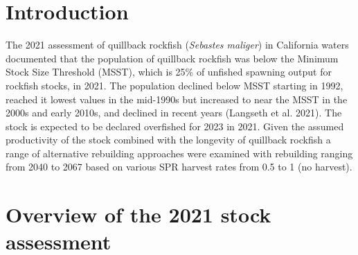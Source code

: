\documentclass[11pt,
  english,
  a4paper,
]{article}
\begin{document}
\pagebreak
\setlength{\parskip}{5mm plus1mm minus1mm}
\setcounter{page}{1}
\renewcommand{\thefigure}{\arabic{figure}}
\renewcommand{\thetable}{\arabic{table}}
\setcounter{table}{0}
\setcounter{figure}{0}

\setlength\parskip{0.2em plus 0.1em minus 0.2em}


\hypertarget{introduction}{%
\section{Introduction}\label{introduction}}

\leavevmode\tagmcend\tagstructend


The 2021 assessment of quillback rockfish (\emph{Sebastes maliger}) in California waters documented that the population of quillback rockfish was below the Minimum Stock Size Threshold (MSST), which is 25\% of unfished spawning output for rockfish stocks, in 2021. The population declined below MSST starting in 1992, reached it lowest values in the mid-1990s but increased to near the MSST in the 2000s and early 2010s, and declined in recent years {(Langseth et al. 2021)\leavevmode\tagmcend\tagstructend}. The stock is expected to be declared overfished for 2023 in 2021. Given the assumed productivity of the stock combined with the longevity of quillback rockfish a range of alternative rebuilding approaches were examined with rebuilding ranging from 2040 to 2067 based on various SPR harvest rates from 0.5 to 1 (no harvest).

\leavevmode\tagmcend\tagstructend\par


\hypertarget{overview-of-the-2021-stock-assessment}{%
\section{Overview of the 2021 stock assessment}\label{overview-of-the-2021-stock-assessment}}

\leavevmode\tagmcend\tagstructend

\end{document}
